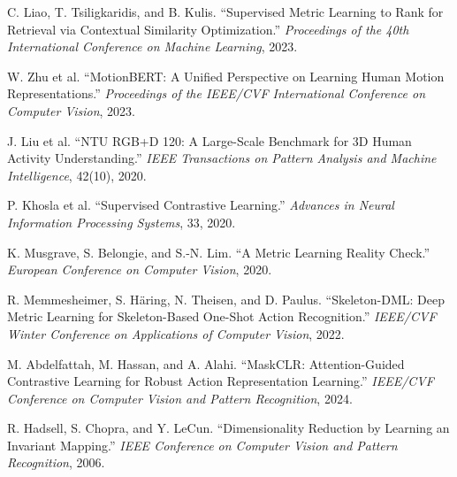 \documentclass[10pt]{article}
\begin{document}
{\small
\begin{enumerate}[label={\textcolor{muted}{[\arabic*]}},leftmargin=2.35em,itemsep=3pt]
  \item C. Liao, T. Tsiligkaridis, and B. Kulis. ``Supervised Metric Learning to Rank for Retrieval via Contextual Similarity Optimization.'' \emph{Proceedings of the 40th International Conference on Machine Learning}, 2023.
  \item W. Zhu et al. ``MotionBERT: A Unified Perspective on Learning Human Motion Representations.'' \emph{Proceedings of the IEEE/CVF International Conference on Computer Vision}, 2023.
  \item J. Liu et al. ``NTU RGB+D 120: A Large-Scale Benchmark for 3D Human Activity Understanding.'' \emph{IEEE Transactions on Pattern Analysis and Machine Intelligence}, 42(10), 2020.
  \item P. Khosla et al. ``Supervised Contrastive Learning.'' \emph{Advances in Neural Information Processing Systems}, 33, 2020.
  \item K. Musgrave, S. Belongie, and S.-N. Lim. ``A Metric Learning Reality Check.'' \emph{European Conference on Computer Vision}, 2020.
  \item R. Memmesheimer, S. H{\"a}ring, N. Theisen, and D. Paulus. ``Skeleton-DML: Deep Metric Learning for Skeleton-Based One-Shot Action Recognition.'' \emph{IEEE/CVF Winter Conference on Applications of Computer Vision}, 2022.
  \item M. Abdelfattah, M. Hassan, and A. Alahi. ``MaskCLR: Attention-Guided Contrastive Learning for Robust Action Representation Learning.'' \emph{IEEE/CVF Conference on Computer Vision and Pattern Recognition}, 2024.
  \item R. Hadsell, S. Chopra, and Y. LeCun. ``Dimensionality Reduction by Learning an Invariant Mapping.'' \emph{IEEE Conference on Computer Vision and Pattern Recognition}, 2006.
\end{enumerate}}
\end{document}
